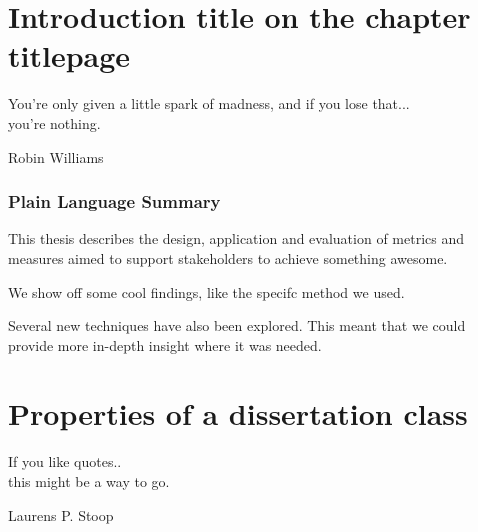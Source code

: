 \documentclass[]{dissertation}
\begin{document}
\part[Introduction title in the TOC]{Introduction title on the chapter titlepage}
\label{part:intro}



\epigraph{
       You're only given a little spark of madness, and if you lose that... \\ you're nothing.
}{Robin Williams}

\section*{Plain Language Summary}
This thesis describes the design, application and evaluation of metrics and measures aimed to support stakeholders to achieve something awesome. 

We show off some cool findings, like the specifc method we used.

Several new techniques have also been explored. 
This meant that we could provide more in-depth insight where it was needed. 

\newpage
\chaptoc








\cleardoublepage






\setcounter{colorcounter}{2}
\part[Properties of a dissertation class]{Properties of a dissertation class}
\label{part:second}

\epigraph{
       If you like quotes..  \\ this might be a way to go.
}{Laurens P. Stoop}
\end{document}
